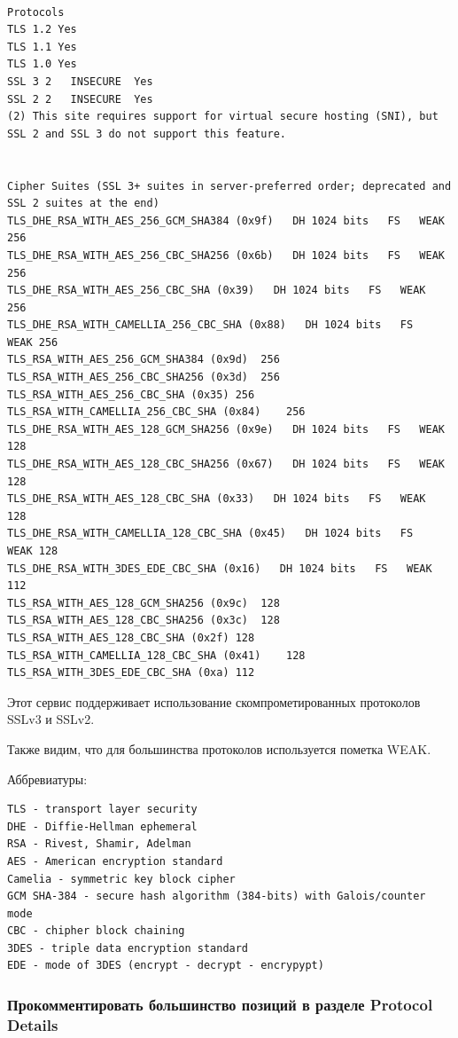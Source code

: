 \documentclass[a4paper]{article}
\begin{document}
\begin{lstlisting}[numbers=none, keywords=none]

Protocols
TLS 1.2	Yes
TLS 1.1	Yes
TLS 1.0	Yes
SSL 3 2   INSECURE	Yes
SSL 2 2   INSECURE	Yes
(2) This site requires support for virtual secure hosting (SNI), but SSL 2 and SSL 3 do not support this feature.


Cipher Suites (SSL 3+ suites in server-preferred order; deprecated and SSL 2 suites at the end)
TLS_DHE_RSA_WITH_AES_256_GCM_SHA384 (0x9f)   DH 1024 bits   FS   WEAK	256
TLS_DHE_RSA_WITH_AES_256_CBC_SHA256 (0x6b)   DH 1024 bits   FS   WEAK	256
TLS_DHE_RSA_WITH_AES_256_CBC_SHA (0x39)   DH 1024 bits   FS   WEAK	256
TLS_DHE_RSA_WITH_CAMELLIA_256_CBC_SHA (0x88)   DH 1024 bits   FS   WEAK	256
TLS_RSA_WITH_AES_256_GCM_SHA384 (0x9d)	256
TLS_RSA_WITH_AES_256_CBC_SHA256 (0x3d)	256
TLS_RSA_WITH_AES_256_CBC_SHA (0x35)	256
TLS_RSA_WITH_CAMELLIA_256_CBC_SHA (0x84)	256
TLS_DHE_RSA_WITH_AES_128_GCM_SHA256 (0x9e)   DH 1024 bits   FS   WEAK	128
TLS_DHE_RSA_WITH_AES_128_CBC_SHA256 (0x67)   DH 1024 bits   FS   WEAK	128
TLS_DHE_RSA_WITH_AES_128_CBC_SHA (0x33)   DH 1024 bits   FS   WEAK	128
TLS_DHE_RSA_WITH_CAMELLIA_128_CBC_SHA (0x45)   DH 1024 bits   FS   WEAK	128
TLS_DHE_RSA_WITH_3DES_EDE_CBC_SHA (0x16)   DH 1024 bits   FS   WEAK	112
TLS_RSA_WITH_AES_128_GCM_SHA256 (0x9c)	128
TLS_RSA_WITH_AES_128_CBC_SHA256 (0x3c)	128
TLS_RSA_WITH_AES_128_CBC_SHA (0x2f)	128
TLS_RSA_WITH_CAMELLIA_128_CBC_SHA (0x41)	128
TLS_RSA_WITH_3DES_EDE_CBC_SHA (0xa)	112

\end{lstlisting}

Этот сервис поддерживает использование скомпрометированных протоколов SSLv3 и SSLv2.

Также видим, что для большинства протоколов используется пометка WEAK.

Аббревиатуры:

\begin{verbatim}
TLS - transport layer security
DHE - Diffie-Hellman ephemeral
RSA - Rivest, Shamir, Adelman
AES - American encryption standard
Camelia - symmetric key block cipher
GCM SHA-384 - secure hash algorithm (384-bits) with Galois/counter mode
CBC - chipher block chaining
3DES - triple data encryption standard
EDE - mode of 3DES (encrypt - decrypt - encrypypt)
\end{verbatim}

\subsubsection{Прокомментировать большинство позиций в разделе Protocol Details}
\end{document}
